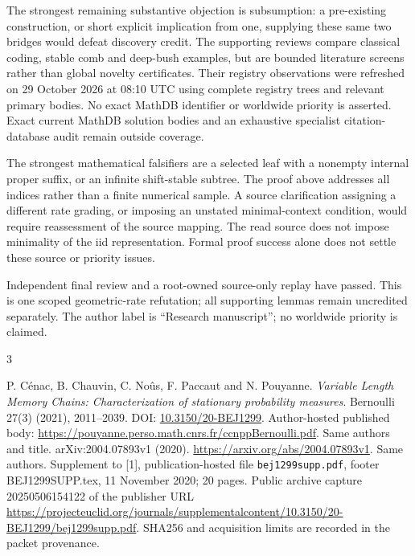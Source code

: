 \documentclass[11pt]{article}
\begin{document}
The strongest remaining substantive objection is subsumption: a pre-existing
construction, or short explicit implication from one, supplying these same
two bridges would defeat discovery credit. The supporting reviews compare
classical coding, stable comb and deep-bush examples, but are bounded
literature screens rather than global novelty certificates. Their registry
observations were refreshed on 29 October 2026 at 08:10 UTC using complete
registry trees and relevant primary bodies. No exact MathDB identifier or
worldwide priority is asserted. Exact current MathDB solution bodies
and an exhaustive specialist citation-database audit remain outside coverage.

The strongest mathematical falsifiers are a selected leaf with a nonempty
internal proper suffix, or an infinite shift-stable subtree. The proof above
addresses all indices rather than a finite numerical sample. A source
clarification assigning a different rate grading, or imposing an unstated
minimal-context condition, would require reassessment of the source mapping.
The read source does not impose minimality of the iid representation.
Formal proof success alone does not settle these source or priority issues.

Independent final review and a root-owned source-only replay have passed.
This is one scoped geometric-rate refutation; all supporting lemmas remain
uncredited separately. The author label is ``Research manuscript''; no
worldwide priority is claimed.

\begin{thebibliography}{3}
\raggedright
{} P. C\'enac, B. Chauvin, C. No\^us, F. Paccaut and
N. Pouyanne. \emph{Variable Length Memory Chains: Characterization of stationary
probability measures}. Bernoulli 27(3) (2021), 2011--2039.
DOI: \href{https://doi.org/10.3150/20-BEJ1299}{10.3150/20-BEJ1299}.
Author-hosted published body:
\url{https://pouyanne.perso.math.cnrs.fr/ccnppBernoulli.pdf}.
 Same authors and title. arXiv:2004.07893v1 (2020).
\url{https://arxiv.org/abs/2004.07893v1}.
 Same authors. Supplement to [1], publication-hosted file
\texttt{bej1299supp.pdf}, footer BEJ1299SUPP.tex, 11 November 2020;
20 pages. Public archive capture 20250506154122 of the publisher URL
\url{https://projecteuclid.org/journals/supplementalcontent/10.3150/20-BEJ1299/bej1299supp.pdf}.
SHA256 and acquisition limits are recorded in the packet provenance.
\end{thebibliography}
\end{document}
